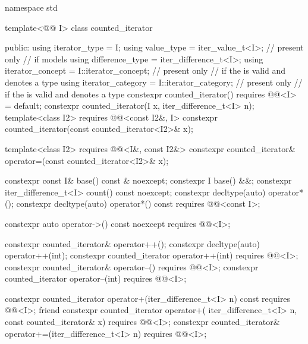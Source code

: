 %
\begin{codeblock}
namespace std {
  template<@@ I>
  class counted_iterator {
  public:
    using iterator_type = I;
    using value_type = iter_value_t<I>;                         // present only
                        // if  models 
    using difference_type = iter_difference_t<I>;
    using iterator_concept = I::iterator_concept;               // present only
                        // if the   is valid and denotes a type
    using iterator_category = I::iterator_category;             // present only
                        // if the   is valid and denotes a type
    constexpr counted_iterator() requires @@<I> = default;
    constexpr counted_iterator(I x, iter_difference_t<I> n);
    template<class I2>
      requires @@<const I2&, I>
        constexpr counted_iterator(const counted_iterator<I2>& x);

    template<class I2>
      requires @@<I&, const I2&>
        constexpr counted_iterator& operator=(const counted_iterator<I2>& x);

    constexpr const I& base() const & noexcept;
    constexpr I base() &&;
    constexpr iter_difference_t<I> count() const noexcept;
    constexpr decltype(auto) operator*();
    constexpr decltype(auto) operator*() const
      requires @@<const I>;

    constexpr auto operator->() const noexcept
      requires @@<I>;

    constexpr counted_iterator& operator++();
    constexpr decltype(auto) operator++(int);
    constexpr counted_iterator operator++(int)
      requires @@<I>;
    constexpr counted_iterator& operator--()
      requires @@<I>;
    constexpr counted_iterator operator--(int)
      requires @@<I>;

    constexpr counted_iterator operator+(iter_difference_t<I> n) const
      requires @@<I>;
    friend constexpr counted_iterator operator+(
      iter_difference_t<I> n, const counted_iterator& x)
        requires @@<I>;
    constexpr counted_iterator& operator+=(iter_difference_t<I> n)
      requires @@<I>;

}}
\end{codeblock}
